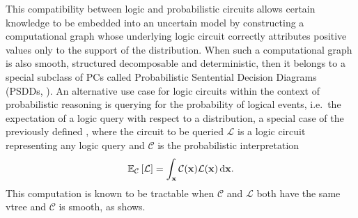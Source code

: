 This compatibility between logic and probabilistic circuits allows certain knowledge to be embedded
into an uncertain model by constructing a computational graph whose underlying logic circuit
correctly attributes positive values only to the support of the distribution. When such a
computational graph is also smooth, structured decomposable and deterministic, then it belongs to a
special subclass of PCs called Probabilistic Sentential Decision Diagrams (PSDDs, \cite{kisa14}).
An alternative use case for logic circuits within the context of probabilistic reasoning is
querying for the probability of logical events, i.e.\ the expectation of a logic query with respect
to a distribution, a special case of the previously defined , where the circuit to be
queried $\mathcal{L}$ is a logic circuit representing any logic query and $\mathcal{C}$ is the
probabilistic interpretation
\begin{equation}
  \mathbb{E}_{\mathcal{C}}\left[\mathcal{L}\right]=\int_{\mathbf{x}}\mathcal{C}(\mathbf{x})\mathcal{L}(\mathbf{x})\mathop{}\!\mathrm{d}\mathbf{x}.
\end{equation}
This computation is known to be tractable when $\mathcal{C}$ and $\mathcal{L}$ both have the same
vtree and $\mathcal{C}$ is smooth, as  shows.

